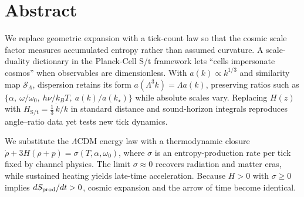 \section*{Abstract}
We replace geometric expansion with a tick-count law so that the cosmic
scale factor measures accumulated entropy rather than assumed curvature.
A scale-duality dictionary in the Planck-Cell S/t framework lets “cells
impersonate cosmos” when observables are dimensionless. With
$a(k)\propto k^{1/3}$ and similarity map $\mathcal S_\Lambda$, dispersion
retains its form $a(\Lambda^3k)=\Lambda a(k)$, preserving ratios such as
$\{\alpha,\ \omega/\omega_0,\ h\nu/k_BT,\ a(k)/a(k_\star)\}$ while absolute
scales vary. Replacing $H(z)$ with $H_{\text{S/t}}=\tfrac13\,\dot k/k$
in standard distance and sound-horizon integrals reproduces
angle–ratio data yet tests new tick dynamics.

We substitute the $\Lambda$CDM energy law with a thermodynamic closure
$\dot\rho+3H(\rho+p)=\sigma(T,\alpha,\omega_0)$, where $\sigma$ is an
entropy-production rate per tick fixed by channel physics. The limit
$\sigma\!\approx\!0$ recovers radiation and matter eras, while sustained
heating yields late-time acceleration. Because $H>0$ with $\sigma\!\ge\!0$
implies $dS_{\rm prod}/dt>0$, cosmic expansion and the arrow of time
become identical.
